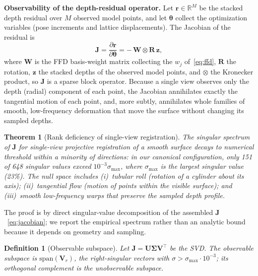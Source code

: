 \documentclass[9pt,twoside,web]{ieeecolor2}
\newtheorem{theorem}{Theorem}
\newtheorem{definition}{Definition}
\begin{document}
\textbf{Observability of the depth-residual operator.} Let $\mathbf{r}\in\mathbb{R}^{M}$ be the stacked depth residual over $M$ observed model points, and let $\boldsymbol{\theta}$ collect the optimization variables (pose increments and lattice displacements). The Jacobian of the residual is
\begin{equation}\label{eq:jacobian}
\mathbf{J} = \frac{\partial\mathbf{r}}{\partial\boldsymbol{\theta}} = -\,\mathbf{W}\otimes\mathbf{R}\,\mathbf{z},
\end{equation}
where $\mathbf{W}$ is the FFD basis-weight matrix collecting the $w_{j}$ of~\eqref{eq:ffd}, $\mathbf{R}$ the rotation, $\mathbf{z}$ the stacked depths of the observed model points, and $\otimes$ the Kronecker product, so $\mathbf{J}$ is a sparse block operator. Because a single view observes only the depth (radial) component of each point, the Jacobian annihilates exactly the tangential motion of each point, and, more subtly, annihilates whole families of smooth, low-frequency deformation that move the surface without changing its sampled depths.

\begin{theorem}[Rank deficiency of single-view registration]\label{thm:rank}
The singular spectrum of $\mathbf{J}$ for single-view projective registration of a smooth surface decays to numerical threshold within a minority of directions: in our canonical configuration, only 151 of 648 singular values exceed $10^{-3}\sigma_{\max}$, where $\sigma_{\max}$ is the largest singular value (23\%). The null space includes (i)~\emph{tubular roll} (rotation of a cylinder about its axis); (ii)~\emph{tangential flow} (motion of points within the visible surface); and (iii)~\emph{smooth low-frequency warps} that preserve the sampled depth profile.
\end{theorem}
The proof is by direct singular-value decomposition of the assembled $\mathbf{J}$~\eqref{eq:jacobian}; we report the empirical spectrum rather than an analytic bound because it depends on geometry and sampling.

\begin{definition}[Observable subspace]
Let $\mathbf{J}=\mathbf{U}\boldsymbol{\Sigma}\mathbf{V}^{\top}$ be the SVD. The \emph{observable subspace} is $\mathrm{span}(\mathbf{V}_{r})$, the right-singular vectors with $\sigma>\sigma_{\max}\cdot10^{-3}$; its orthogonal complement is the \emph{unobservable subspace}.
\end{definition}
\end{document}
